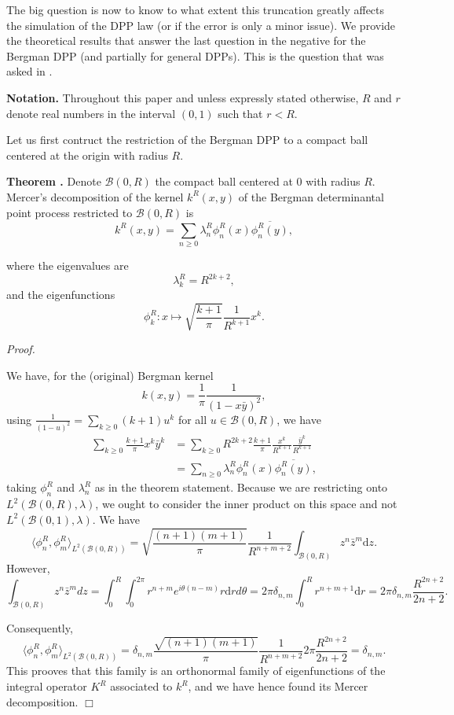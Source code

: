 \documentclass[11pt]{article}
\newcommand{\qed}{\hfill$\Box$}
\newcounter{cnt}
\newcommand{\cnt}{\thecnt \stepcounter{cnt}}
\begin{document}
The big question is now to know to what extent this truncation greatly affects the simulation of the DPP law (or if the error is only a minor issue). We provide the theoretical results that answer the last question in the negative for the Bergman DPP (and partially for general DPPs). This is the question that was asked in \cite{Decreusefond2016}.

\textbf{Notation.} Throughout this paper and unless expressly stated otherwise, $R$ and $r$ denote real
numbers in the interval $(0, 1)$ such that $r < R$.

Let us first contruct the restriction of the Bergman DPP to a compact ball centered at the origin
with radius $R$.

\textbf{Theorem \cnt.} Denote $\mathcal{B}(0, R)$ the compact ball centered at 0 with radius $R$. Mercer's decomposition of the kernel $k^R(x,y)$ of the Bergman determinantal point process restricted to
$\mathcal{B}(0, R)$ is
\[
k^R(x,y) = \sum_{n \ge 0} \lambda_n^R \phi_n^R(x) \overline{\phi_n^R(y)},
\]

where the eigenvalues are
\[
\lambda_k^R = R^{2k+2},
\]
and the eigenfunctions
\[
\phi_k^R : x \mapsto \sqrt{\frac{k+1}{\pi}} \frac{1}{R^{k+1}} x^k.
\]

\textit{Proof.}

We have, for the (original) Bergman kernel
\[
k(x,y) = \frac{1}{\pi} \frac{1}{(1 - x\bar{y})^2},
\]
using $\frac{1  }{(1-u)^2} = \sum_{k \ge 0} (k+1)u^k$ for all $u \in \mathcal{B}(0,R)$, we have
\begin{align*}
\sum_{k \ge 0} \frac{k+1}{\pi} x^k \bar{y}^k &= \sum_{k \ge 0} R^{2k+2} \frac{k+1}{\pi} \frac{x^k}{R^{k+1}} \frac{\bar{y}^k}{R^{k+1}} \\
&= \sum_{n \ge 0} \lambda_n^R \phi_n^R(x) \overline{\phi_n^R(y)},
\end{align*}
taking $\phi_n^R$ and $\lambda_n^R$ as in the theorem statement. Because we are restricting onto $L^2(\mathcal{B}(0,R), \lambda)$, we ought to consider the inner product on this space and not $L^2(\mathcal{B}(0,1), \lambda)$. We have
\[
\langle \phi_n^R, \phi_m^R \rangle_{L^2(\mathcal{B}(0,R))} = \sqrt{\frac{(n+1)(m+1)}{\pi}} \frac{1}{R^{n+m+2}} \int_{\mathcal{B}(0,R)} z^n \bar{z}^m \mathrm dz.
\]
However,
\[
\int_{\mathcal{B}(0,R)} z^n \bar{z}^m dz = \int_0^R \int_0^{2\pi} r^{n+m} e^{i\theta(n-m)} r \mathrm dr d\theta = 2\pi \delta_{n,m} \int_0^R r^{n+m+1} \mathrm dr = 2\pi \delta_{n,m} \frac{R^{2n+2}}{2n+2}.
\]

Consequently,
\[
\langle \phi_n^R, \phi_m^R \rangle_{L^2(\mathcal{B}(0,R))} = \delta_{n,m} \frac{\sqrt{(n+1)(m+1)}}{\pi} \frac{1}{R^{n+m+2}} 2\pi \frac{R^{2n+2}}{2n+2} = \delta_{n,m}.
\]
This prooves that this family is an orthonormal family of eigenfunctions of the integral operator $K^R$ associated to $k^R$, and we have hence found its Mercer decomposition. \qed
\end{document}
